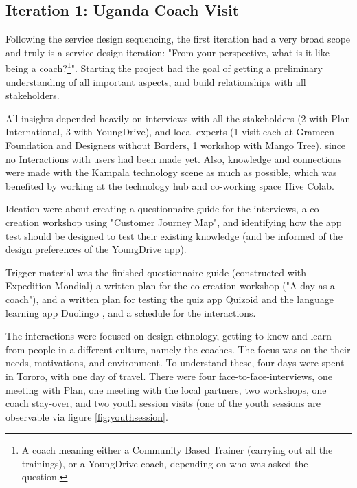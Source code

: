 \subsection{Iteration 1: Uganda Coach Visit}


Following the service design sequencing, the first iteration had a very broad scope and truly is a service design iteration: "From your perspective, what is it like being a coach?\footnote{A coach meaning either a Community Based Trainer (carrying out all the trainings), or a YoungDrive coach, depending on who was asked the question.}". Starting the project had the goal of getting a preliminary understanding of all important aspects, and build relationships with all stakeholders.


All insights depended heavily on interviews with all the stakeholders  (2 with Plan International, 3 with YoungDrive), and local experts (1 visit each at Grameen Foundation and Designers without Borders, 1 workshop with Mango Tree), since no Interactions with users had been made yet. Also, knowledge and connections were made with the Kampala technology scene as much as possible, which was benefited by working at the technology hub and co-working space Hive Colab.

Ideation were about creating a questionnaire guide for the interviews, a co-creation workshop using "Customer Journey Map", and identifying how the app test should be designed to test their existing knowledge (and be informed of the design preferences of the YoungDrive app).

Trigger material was the finished questionnaire guide (constructed with Expedition Mondial) a written plan for the co-creation workshop ("A day as a coach"), and a written plan for testing the quiz app Quizoid \citep{quizoid} and the language learning app Duolingo \citep{duolingo}, and a schedule for the interactions.

The interactions were focused on design ethnology, getting to know and learn from people in a different culture, namely the coaches. The focus was on the their needs, motivations, and environment. To understand these, four days were spent in Tororo, with one day of travel. There were four face-to-face-interviews,
one meeting with Plan, one meeting with the local partners, two workshops, one coach stay-over, and two youth session visits (one of the youth sessions are observable via figure \ref{fig:youthsession}.

